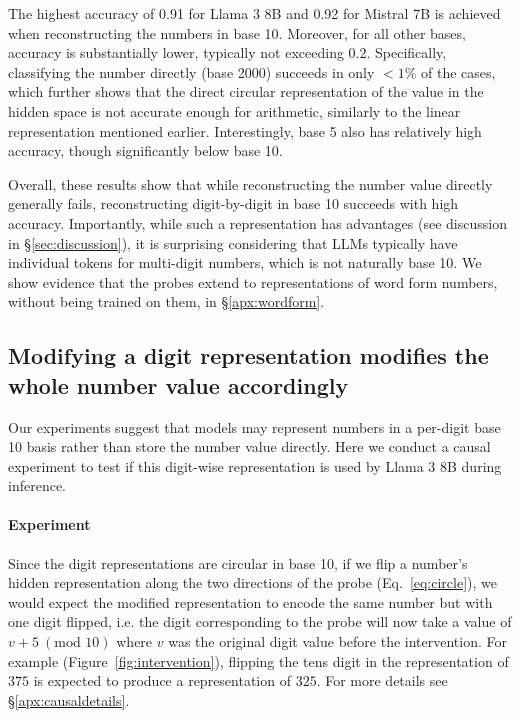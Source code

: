 \documentclass[11pt]{article}
\begin{document}
The highest accuracy of 0.91 for Llama 3 8B and 0.92 for Mistral 7B is achieved when reconstructing the numbers in base 10. Moreover, for all other bases, accuracy is substantially lower, typically not exceeding 0.2. 
Specifically, classifying the number directly (base 2000) succeeds in only $<1\%$ of the cases, which further shows that the direct circular representation of the value in the hidden space is not accurate enough for arithmetic, similarly to the linear representation mentioned earlier. Interestingly, base 5 also has relatively high accuracy, though significantly below base 10.

Overall, these results show that while reconstructing the number value directly generally fails, reconstructing digit-by-digit in base 10 succeeds with high accuracy. 
Importantly, while such a representation has advantages (see discussion in \S\ref{sec:discussion}), it is surprising considering that LLMs typically have individual tokens for multi-digit numbers, which is not naturally base 10. We show evidence that the probes extend to representations of word form numbers, without being trained on them, in \S\ref{apx:wordform}.


\subsection{Modifying a digit representation modifies the whole number value accordingly}
\label{sec:intervention}

Our experiments suggest that models may represent numbers in a per-digit base 10 basis rather than store the number value directly.
Here we conduct a causal experiment to test if this digit-wise representation is used by Llama 3 8B during inference.


\paragraph{Experiment}
Since the digit representations are circular in base 10, if we flip a number's hidden representation along the two directions of the probe (Eq.~\ref{eq:circle}), we would expect the modified representation to encode the same number but with one digit flipped, i.e. the digit corresponding to the probe will now take a value of $v+5\ (\text{mod } 10)$ where $v$ was the original digit value before the intervention.
For example (Figure~\ref{fig:intervention}), flipping the tens digit in the representation of $375$ is expected to produce a representation of $325$.
For more details see \S\ref{apx:causaldetails}.
\end{document}
